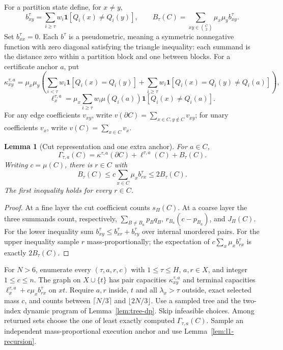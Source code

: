 \documentclass[11pt]{article}
\newtheorem{lemma}[theorem]{Lemma}
\theoremstyle{definition}
\newcommand{\ind}{\mathbf 1}
\newcommand{\cut}{\partial}
\begin{document}
For a partition state define, for $x\ne y$,
\[
 b^\tau_{xy}=\sum_{i\ge\tau}w_i\ind[Q_i(x)\ne Q_i(y)],
 \qquad B_\tau(C)=\sum_{xy\in\binom C2}\mu_x\mu_yb^\tau_{xy}.
\]
Set $b^\tau_{xx}=0$. Each $b^\tau$ is a pseudometric, meaning a symmetric
nonnegative function with zero diagonal satisfying the triangle inequality:
each summand is the distance zero within a partition block and one between
blocks. For a certificate anchor $a$, put
\[
 \kappa^{\tau,a}_{xy}=\mu_x\mu_y\left(
  \sum_{i<\tau}w_i\ind[Q_i(x)=Q_i(y)]
 +\sum_{i\ge\tau}w_i\ind[Q_i(x)=Q_i(y)\ne Q_i(a)]\right),
\]
\[
 \ell^{\tau,a}_x=
 \mu_x\sum_{i\ge\tau}w_i\mu(Q_i(a))\ind[Q_i(x)\ne Q_i(a)].
\]
For any edge coefficients $v_{xy}$, write
$v(\cut C)=\sum_{x\in C,y\notin C}v_{xy}$; for unary coefficients
$v_x$, write $v(C)=\sum_{x\in C}v_x$.

\begin{lemma}[Cut representation and one extra anchor]\label{lem:medoid}
For $a\in C$,
\[
 \Gamma_{\tau,a}(C)=\kappa^{\tau,a}(\cut C)+\ell^{\tau,a}(C)+B_\tau(C).
\]
Writing $c=\mu(C)$, there is $r\in C$ with
\[
 B_\tau(C)\le c\sum_{x\in C}\mu_xb^\tau_{rx}
       \le2B_\tau(C).
\]
The first inequality holds for every $r\in C$.
\end{lemma}
\begin{proof}
At a fine layer the cut coefficient counts $s_\Pi(C)$. At a coarse
layer the three summands count, respectively,
$\sum_{B\ne B_a}p_Bq_B$, $r_{B_a}(c-p_{B_a})$, and $J_\Pi(C)$.
For the lower inequality sum
$b^\tau_{xy}\le b^\tau_{xr}+b^\tau_{ry}$ over internal unordered pairs.
For the upper inequality sample $r$ mass-proportionally; the expectation
of $c\sum_x\mu_xb^\tau_{rx}$ is exactly $2B_\tau(C)$.
\end{proof}

For $N>6$, enumerate every $(\tau,a,r,c)$ with $1\le\tau\le H$,
$a,r\in X$, and integer $1\le c\le n$. The graph on $X\cup\{t\}$
has pair capacities $\kappa^{\tau,a}_{xy}$ and terminal capacities
$\ell^{\tau,a}_x+c\mu_xb^\tau_{rx}$ on $xt$.
Require $a,r$ inside, $t$ and all $\lambda_x>\tau$ outside, exact selected
mass $c$, and counts between $\lceil N/3\rceil$ and $\lfloor2N/3\rfloor$.
Use a sampled tree and the two-index dynamic program of
Lemma~\ref{lem:tree-dp}. Skip infeasible choices. Among returned sets choose
the one of least exactly computed $\Gamma_{\tau,a}(C)$.
Sample an independent mass-proportional execution anchor and use
Lemma~\ref{lem:l1-recursion}.
\end{document}
